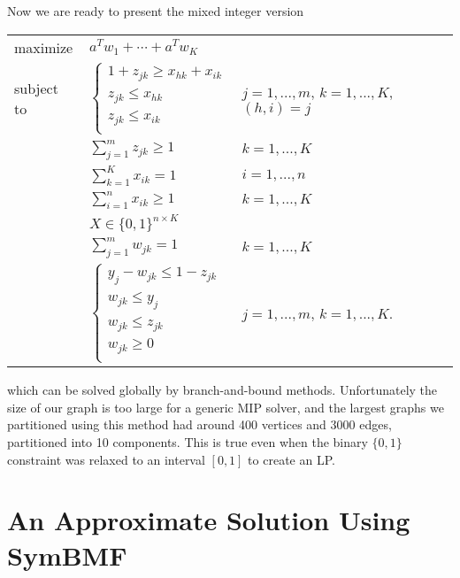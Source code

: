 Now we are ready to present the mixed integer version
\begin{center}
\bgroup
\def\arraystretch{1.5}
\begin{tabular}{l l l}
maximize   & $a^T w_1 + \cdots + a^T w_K$ \\
subject to 
           & $\begin{cases}
                 1 + z_{jk} \geq x_{hk} + x_{ik} \\
                 z_{jk} \leq x_{hk}             \\
                 z_{jk} \leq x_{ik}             \\
             \end{cases}$
           & $j = 1, ..., m$, $k = 1, ..., K$, $(h,i) = j$ \\
           & $\sum_{j=1}^m z_{jk} \geq 1$ & $k = 1, ..., K$ \\
           & $\sum_{k=1}^K x_{ik} = 1$ & $i = 1, ..., n$ \\
           & $\sum_{i=1}^n x_{ik} \geq 1$ & $k = 1, ..., K$ \\
           & $X \in \{0, 1\}^{n \times K}$ \\
           & $\sum_{j=1}^m w_{jk} = 1$ & $k = 1, ..., K$ \\
           & $\begin{cases}
                y_j - w_{jk} \leq 1 - z_{jk} \\
                w_{jk} \leq y_j \\
                w_{jk} \leq z_{jk} \\
                w_{jk} \geq 0 \\
             \end{cases}$
           & $j = 1, ..., m$, $k = 1, ..., K$. \\
\end{tabular}
\egroup
\end{center}
which can be solved globally by branch-and-bound methods.
Unfortunately the size of our graph is too large for a generic MIP
solver, and the largest graphs we partitioned using this method had
around 400 vertices and 3000 edges, partitioned into 10 components.
This is true even when the binary $\{0, 1\}$ constraint was relaxed
to an interval $[0, 1]$ to create an LP.


\section{An Approximate Solution Using SymBMF}

